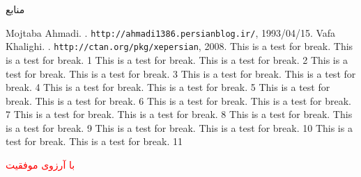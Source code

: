 \documentclass[10pt,xcolor=dvipsnames]{beamer}
\newcommand{\nologo}{\setbeamertemplate{logo}{}}
\begin{document}
\begin{frame}[allowframebreaks]{منابع}
\begin{latin}
\begin{thebibliography}{9}
Mojtaba Ahmadi.
 .
 \newblock \texttt{http://ahmadi1386.persianblog.ir/}, 1993/04/15.
 Vafa Khalighi.
 .
 \newblock \texttt{http://ctan.org/pkg/xepersian}, 2008.
 This is a test for break.  This is a test for break. 1
 This is a test for break.  This is a test for break. 2
 This is a test for break.  This is a test for break. 3
 This is a test for break.  This is a test for break. 4
 This is a test for break.  This is a test for break. 5
 This is a test for break.  This is a test for break. 6
 This is a test for break.  This is a test for break. 7
 This is a test for break.  This is a test for break. 8
 This is a test for break.  This is a test for break. 9
 This is a test for break.  This is a test for break. 10
 This is a test for break.  This is a test for break. 11
\end{thebibliography}
\end{latin}

\end{frame}
%
\nologo
\begin{frame}
\begin{center}
\Huge {\nas
\textcolor{red}{با آرزوی موفقیت}}
\end{center}
\end{frame}
\end{document}
